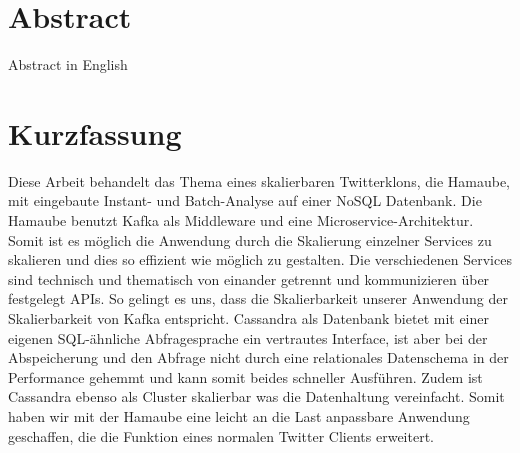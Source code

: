 


\newpage
\chapter*{Abstract}
Abstract in English

\chapter*{Kurzfassung}
Diese Arbeit behandelt das Thema eines skalierbaren Twitterklons, die Hamaube, mit eingebaute Instant- und Batch-Analyse auf einer NoSQL Datenbank. Die Hamaube benutzt Kafka als Middleware und eine Microservice-Architektur. Somit ist es möglich die Anwendung durch die Skalierung einzelner Services zu skalieren und dies so effizient wie möglich zu gestalten. Die verschiedenen Services sind technisch und thematisch von einander getrennt und kommunizieren über festgelegt APIs. So gelingt es uns, dass die Skalierbarkeit unserer Anwendung der Skalierbarkeit von Kafka entspricht. Cassandra als Datenbank bietet mit einer eigenen SQL-ähnliche Abfragesprache ein vertrautes Interface, ist aber bei der Abspeicherung und den Abfrage nicht durch eine relationales Datenschema in der Performance gehemmt und kann somit beides schneller Ausführen. Zudem ist Cassandra ebenso als Cluster skalierbar was die Datenhaltung vereinfacht. Somit haben wir mit der Hamaube eine leicht an die Last anpassbare Anwendung geschaffen, die die Funktion eines normalen Twitter Clients erweitert.



\linespread{1.25}\selectfont

\tableofcontents %
\listoffigures  %
\blankpage










